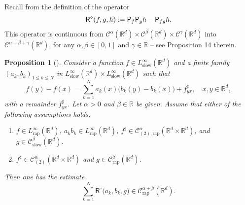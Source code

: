 \documentclass[10pt]{amsart}
\newenvironment{enumeratea}
{\bgroup\def\theenumi{\alph{enumi}}\begin{enumerate}}
{\end{enumerate}\egroup}
\theoremstyle{plain}
\newtheorem{prop}[thm]{Proposition}
\theoremstyle{definition}
\newcommand{\rap}{\mathrm{rap}}
\newcommand{\slow}{\mathrm{slow}}
\newcommand{\sfR}{\mathsf{R}}
\newcommand{\bbR}{\mathbb{R}}
\newcommand{\mcC}{\mathcal{C}}
\begin{document}
Recall from \cite{BB16} the definition of the operator
\[
{\sfR}^\circ(f,g,h) := {\sf P}_f{\sf P}_gh - {\sf P}_{fg}h.
\]
This operator is continuous from $\mcC^\alpha(\bbR^d)\times \mcC^\beta(\bbR^d)\times \mcC^\gamma(\bbR^d)$ into $\mcC^{\alpha+\beta+\gamma}(\bbR^d)$, for any $\alpha,\beta\in[0,1]$ and $\gamma\in\bbR$ -- see Proposition 14 therein.

\begin{prop}[{\cite[Prop.\,10]{BH}}]
\label{prop:sum of R}
Consider a function $f\in L_\slow^\infty(\bbR^d)$ and a finite family $(a_k,b_k)_{1\le k\le N}$ in $L_\slow^\infty(\bbR^d)\times L_\slow^\infty(\bbR^d)$ such that
\[
f(y)-f(x) = \sum_{k=1}^N a_k(x)\bigl(b_k(y)-b_k(x)\bigr) + f_{yx}^\sharp,\quad x,y\in\bbR^d,
\]
with a remainder $f_{yx}^\sharp$.
Let $\alpha>0$ and $\beta\in\bbR$ be given. Assume that either of the following assumptions holds.
\begin{enumeratea}
\item\label{prop:sum of Ra} $f\in L_\rap^\infty(\bbR^d)$, $a_kb_k\in L_\rap^\infty(\bbR^d)$, $f^\sharp\in\mcC_{(2),\rap}^\alpha(\bbR^d\times\bbR^d)$, and $g\in \mcC_\slow^\beta(\bbR^d)$.
\item\label{prop:sum of Rb} $f^\sharp\in\mcC_{(2)}^\alpha(\bbR^d\times\bbR^d)$ and $g\in \mcC_\rap^\beta(\bbR^d)$.
\end{enumeratea}
Then one has the estimate
\[
\sum_{k=1}^N {\sfR}^\circ\bigl(a_k,b_k,g\bigr)\in \mcC_\rap^{\alpha+\beta}(\bbR^d).
\]
\end{prop}
\end{document}
